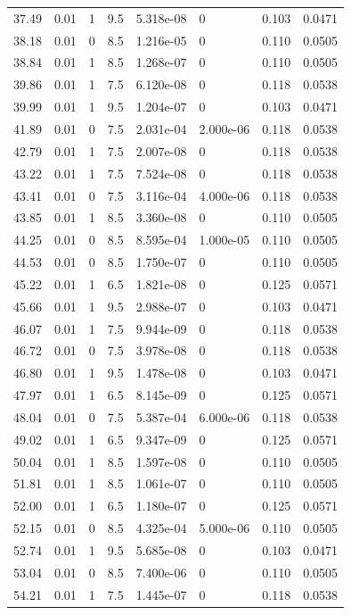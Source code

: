 \documentclass[preview]{standalone}
\begin{document}
{{{\begin{tabular}{L{1.2cm}C{1.2cm} C{0.3cm}C{0.5cm} C{1.4cm}C{1.4cm} C{1.4cm}C{1.4cm}}
  37.49  &  0.01  & 1     & 9.5 &  5.318e-08  & 0  & 0.103 &  0.0471   \\ 
  38.18  &  0.01  & 0     & 8.5 &  1.216e-05  & 0  & 0.110 &  0.0505   \\ 
  38.84  &  0.01  & 1     & 8.5 &  1.268e-07  & 0  & 0.110 &  0.0505   \\ 
  39.86  &  0.01  & 1     & 7.5 &  6.120e-08  & 0  & 0.118 &  0.0538   \\ 
  39.99  &  0.01  & 1     & 9.5 &  1.204e-07  & 0  & 0.103 &  0.0471   \\ 
  41.89  &  0.01  & 0     & 7.5 &  2.031e-04  & 2.000e-06  & 0.118 &  0.0538   \\ 
  42.79  &  0.01  & 1     & 7.5 &  2.007e-08  & 0  & 0.118 &  0.0538   \\ 
  43.22  &  0.01  & 1     & 7.5 &  7.524e-08  & 0  & 0.118 &  0.0538   \\ 
  43.41  &  0.01  & 0     & 7.5 &  3.116e-04  & 4.000e-06  & 0.118 &  0.0538   \\ 
  43.85  &  0.01  & 1     & 8.5 &  3.360e-08  & 0  & 0.110 &  0.0505   \\ 
  44.25  &  0.01  & 0     & 8.5 &  8.595e-04  & 1.000e-05  & 0.110 &  0.0505   \\ 
  44.53  &  0.01  & 0     & 8.5 &  1.750e-07  & 0  & 0.110 &  0.0505   \\ 
  45.22  &  0.01  & 1     & 6.5 &  1.821e-08  & 0  & 0.125 &  0.0571   \\ 
  45.66  &  0.01  & 1     & 9.5 &  2.988e-07  & 0  & 0.103 &  0.0471   \\ 
  46.07  &  0.01  & 1     & 7.5 &  9.944e-09  & 0  & 0.118 &  0.0538   \\ 
  46.72  &  0.01  & 0     & 7.5 &  3.978e-08  & 0  & 0.118 &  0.0538   \\ 
  46.80  &  0.01  & 1     & 9.5 &  1.478e-08  & 0  & 0.103 &  0.0471   \\ 
  47.97  &  0.01  & 1     & 6.5 &  8.145e-09  & 0  & 0.125 &  0.0571   \\ 
  48.04  &  0.01  & 0     & 7.5 &  5.387e-04  & 6.000e-06  & 0.118 &  0.0538   \\ 
  49.02  &  0.01  & 1     & 6.5 &  9.347e-09  & 0  & 0.125 &  0.0571   \\ 
  50.04  &  0.01  & 1     & 8.5 &  1.597e-08  & 0  & 0.110 &  0.0505   \\ 
  51.81  &  0.01  & 1     & 8.5 &  1.061e-07  & 0  & 0.110 &  0.0505   \\ 
  52.00  &  0.01  & 1     & 6.5 &  1.180e-07  & 0  & 0.125 &  0.0571   \\ 
  52.15  &  0.01  & 0     & 8.5 &  4.325e-04  & 5.000e-06  & 0.110 &  0.0505   \\ 
  52.74  &  0.01  & 1     & 9.5 &  5.685e-08  & 0  & 0.103 &  0.0471   \\ 
  53.04  &  0.01  & 0     & 8.5 &  7.400e-06  & 0  & 0.110 &  0.0505   \\ 
  54.21  &  0.01  & 1     & 7.5 &  1.445e-07  & 0  & 0.118 &  0.0538   \\ 
\hline 
\end{tabular} 

}}}
\end{document}
